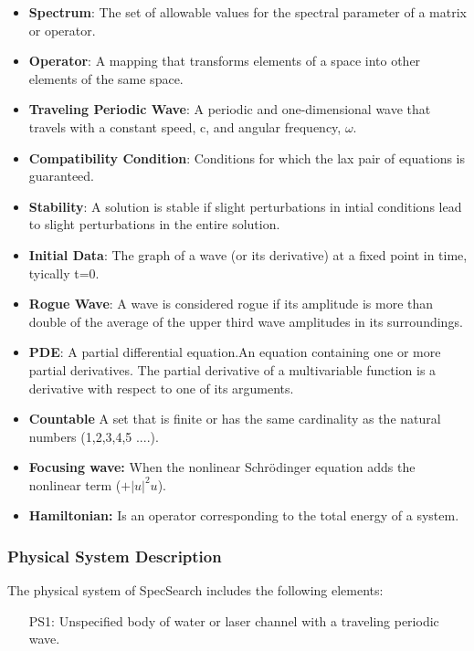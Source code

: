 \documentclass[12pt]{article}
\begin{document}
\begin{itemize}

\item \textbf{Spectrum}: The set of allowable values for the spectral parameter 
of a matrix or operator.
\item \textbf{Operator}: A mapping that transforms elements of a space into 
other elements of the same space. 
\item \textbf{Traveling Periodic Wave}: A periodic and one-dimensional wave 
that travels with a constant speed, c, and angular frequency, $\omega$. 
\item \textbf{Compatibility Condition}: Conditions for which the lax pair of 
equations is guaranteed. 
\item \textbf{Stability}: A solution is stable if slight perturbations in 
intial conditions lead 
to slight perturbations in the entire solution.
\item \textbf{Initial Data}: The graph of a wave (or its derivative) 
at a fixed point in time, tyically t=0.
\item \textbf{Rogue Wave}: A wave is considered rogue if its amplitude is more 
than double of the average of the upper third wave amplitudes in its 
surroundings. 
\item \textbf{PDE}: A partial differential equation.An equation containing one 
or more partial derivatives. The partial derivative of a multivariable function 
is a derivative with respect to one of its arguments. 
\item \textbf{Countable} A set that is finite or has the same cardinality as 
the natural numbers (1,2,3,4,5 ....). 
\item \textbf{Focusing wave:} When the nonlinear Schr\"{o}dinger equation adds 
the 
nonlinear term ($+|u|^{2}u$).  
\item \textbf{Hamiltonian:} Is an operator corresponding to the total energy of 
a system. 

\end{itemize}

\subsubsection{Physical System Description}

The physical system of SpecSearch includes the following elements:

\begin{itemize}

\item[PS1:] 
Unspecified body of water or laser channel with a traveling periodic 
wave.

\end{itemize}
\end{document}
